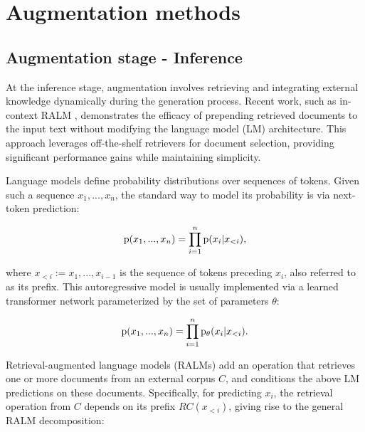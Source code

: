 


\section{Augmentation methods}

\subsection{Augmentation stage - Inference}

At the inference stage, augmentation involves retrieving and integrating external knowledge dynamically during the generation process. Recent work, such as in-context RALM \cite{ram2023incontext}, demonstrates the efficacy of prepending retrieved documents to the input text without modifying the language model (LM) architecture. This approach leverages off-the-shelf retrievers for document selection, providing significant performance gains while maintaining simplicity.

Language models define probability distributions over sequences of tokens. Given such a sequence \(x_1, ..., x_n\), the standard way to model its probability is via next-token prediction:

\[
{\rm{p}}(x_1, ..., x_n) = \prod_{i=1}^{n} {\rm{p}}(x_i | x_{<i}),
\]

where \(x_{<i} := x_1, ..., x_{i-1}\) is the sequence of tokens preceding \(x_i\), also referred to as its prefix. This autoregressive model is usually implemented via a learned transformer network \cite{vaswani2017} parameterized by the set of parameters \(\theta\):

\[
{\rm{p}}(x_1, ..., x_n) = \prod_{i=1}^{n} {\rm{p}}_{\theta}(x_i | x_{<i}).
\]

Retrieval-augmented language models (RALMs) add an operation that retrieves one or more documents from an external corpus \(C\), and conditions the above LM predictions on these documents. Specifically, for predicting \(x_i\), the retrieval operation from \(C\) depends on its prefix \({RC(x_{<i})}\), giving rise to the general RALM decomposition:

